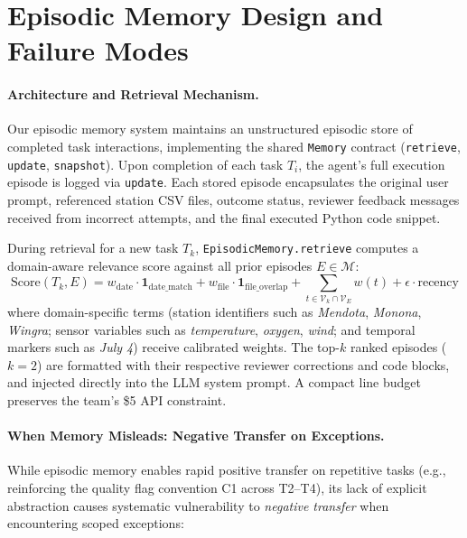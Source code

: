 
\section{Episodic Memory Design and Failure Modes}

\paragraph{Architecture and Retrieval Mechanism.}
Our episodic memory system maintains an unstructured episodic store of completed task interactions, implementing the shared \texttt{Memory} contract (\texttt{retrieve}, \texttt{update}, \texttt{snapshot}). Upon completion of each task $T_i$, the agent's full execution episode is logged via \texttt{update}. Each stored episode encapsulates the original user prompt, referenced station CSV files, outcome status, reviewer feedback messages received from incorrect attempts, and the final executed Python code snippet.

During retrieval for a new task $T_k$, \texttt{EpisodicMemory.retrieve} computes a domain-aware relevance score against all prior episodes $E \in \mathcal{M}$:
\begin{equation}
\text{Score}(T_k, E) = w_{\text{date}} \cdot \mathbf{1}_{\text{date\_match}} + w_{\text{file}} \cdot \mathbf{1}_{\text{file\_overlap}} + \sum_{t \in \mathcal{V}_k \cap \mathcal{V}_E} w(t) + \epsilon \cdot \text{recency}
\end{equation}
where domain-specific terms (station identifiers such as \textit{Mendota}, \textit{Monona}, \textit{Wingra}; sensor variables such as \textit{temperature}, \textit{oxygen}, \textit{wind}; and temporal markers such as \textit{July 4}) receive calibrated weights. The top-$k$ ranked episodes ($k=2$) are formatted with their respective reviewer corrections and code blocks, and injected directly into the LLM system prompt. A compact line budget preserves the team's \$5 API constraint.

\paragraph{When Memory Misleads: Negative Transfer on Exceptions.}
While episodic memory enables rapid positive transfer on repetitive tasks (e.g., reinforcing the quality flag convention C1 across T2--T4), its lack of explicit abstraction causes systematic vulnerability to \emph{negative transfer} when encountering scoped exceptions:

